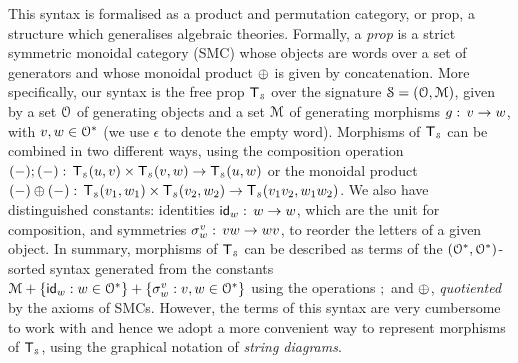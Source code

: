 This syntax is formalised as a product and permutation category, or prop, a structure which generalises algebraic theories. Formally, a \emph{prop} is a strict symmetric monoidal category (SMC) whose objects are words over a set of generators and whose monoidal product $\oplus$ is given by concatenation. 
More specifically, our syntax is the free prop $\mathsf{T}_{\scriptscriptstyle \mathcal{S}}$ over the signature $\mathcal{S} = (\mathcal{O},\mathcal{M})$, given by a set $\mathcal{O}$ of generating objects and a set $\mathcal{M}$  of generating morphisms $g\mathrel{:}\, v\to w$, with $v,w\in \mathcal{O}^*$ (we use $\epsilon$ to denote the empty word). Morphisms of  $\mathsf{T}_{\scriptscriptstyle \mathcal{S}}$ can be combined in two different ways, using the composition operation $(-);(-)\mathrel{:}\, \mathsf{T}_{\scriptscriptstyle \mathcal{S}}(u,v)\times \mathsf{T}_{\scriptscriptstyle \mathcal{S}}(v,w)\to \mathsf{T}_{\scriptscriptstyle \mathcal{S}}(u,w)$ or the monoidal product $(-)\oplus(-)\mathrel{:}\, \mathsf{T}_{\scriptscriptstyle \mathcal{S}}(v_1,w_1)\times \mathsf{T}_{\scriptscriptstyle \mathcal{S}}(v_2,w_2)\to \mathsf{T}_{\scriptscriptstyle \mathcal{S}}(v_1 v_2,w_1 w_2)$. We also have distinguished constants: identities $\mathsf{id}_w\mathrel{:}\, w\to w$, which are the unit for composition, and symmetries $\sigma^v_w\mathrel{:}\, vw\to wv$, to reorder the letters of a given object. In summary, morphisms of $\mathsf{T}_{\scriptscriptstyle \mathcal{S}}$ can be described as terms of the $(\mathcal{O}^*,\mathcal{O}^*)$-sorted syntax generated from the constants $\mathcal{M} + \{\mathsf{id}_w : w\in \mathcal{O}^*\}+ \{\sigma^v_w : v,w\in \mathcal{O}^*\}$ using the operations $;$ and $\oplus$, \emph{quotiented} by the axioms of SMCs. However, the terms of this syntax are very cumbersome to work with and hence we adopt a more convenient way to represent morphisms of $\mathsf{T}_{\scriptscriptstyle \mathcal{S}}$, using the graphical notation of \emph{string diagrams}. 

